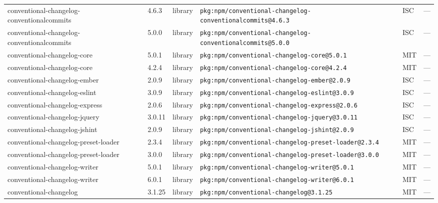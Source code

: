 \documentclass[11pt,a4paper]{article}
\begin{document}
\begin{longtable}{|p{4cm}|p{2cm}|p{1.6cm}|p{5cm}|p{1.5cm}|p{3.5cm}|}
\raggedright conventional-changelog-conventionalcommits & 4.6.3 & library & \small\texttt{pkg:npm/conventional-changelog-conventionalcommits@4.6.3} & ISC & \small — \\
\raggedright conventional-changelog-conventionalcommits & 5.0.0 & library & \small\texttt{pkg:npm/conventional-changelog-conventionalcommits@5.0.0} & ISC & \small — \\
\raggedright conventional-changelog-core & 5.0.1 & library & \small\texttt{pkg:npm/conventional-changelog-core@5.0.1} & MIT & \small — \\
\raggedright conventional-changelog-core & 4.2.4 & library & \small\texttt{pkg:npm/conventional-changelog-core@4.2.4} & MIT & \small — \\
\raggedright conventional-changelog-ember & 2.0.9 & library & \small\texttt{pkg:npm/conventional-changelog-ember@2.0.9} & ISC & \small — \\
\raggedright conventional-changelog-eslint & 3.0.9 & library & \small\texttt{pkg:npm/conventional-changelog-eslint@3.0.9} & ISC & \small — \\
\raggedright conventional-changelog-express & 2.0.6 & library & \small\texttt{pkg:npm/conventional-changelog-express@2.0.6} & ISC & \small — \\
\raggedright conventional-changelog-jquery & 3.0.11 & library & \small\texttt{pkg:npm/conventional-changelog-jquery@3.0.11} & ISC & \small — \\
\raggedright conventional-changelog-jshint & 2.0.9 & library & \small\texttt{pkg:npm/conventional-changelog-jshint@2.0.9} & ISC & \small — \\
\raggedright conventional-changelog-preset-loader & 2.3.4 & library & \small\texttt{pkg:npm/conventional-changelog-preset-loader@2.3.4} & MIT & \small — \\
\raggedright conventional-changelog-preset-loader & 3.0.0 & library & \small\texttt{pkg:npm/conventional-changelog-preset-loader@3.0.0} & MIT & \small — \\
\raggedright conventional-changelog-writer & 5.0.1 & library & \small\texttt{pkg:npm/conventional-changelog-writer@5.0.1} & MIT & \small — \\
\raggedright conventional-changelog-writer & 6.0.1 & library & \small\texttt{pkg:npm/conventional-changelog-writer@6.0.1} & MIT & \small — \\
\raggedright conventional-changelog & 3.1.25 & library & \small\texttt{pkg:npm/conventional-changelog@3.1.25} & MIT & \small — \\

\end{longtable}
\end{document}
